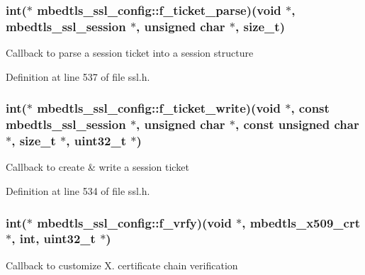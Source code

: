\hypertarget{structmbedtls__ssl__config_a8524cfef06d1e707603437926a487089}{
\subsubsection[{f\-\_\-ticket\-\_\-parse}]{\setlength{\rightskip}{0pt plus 5cm}int($\ast$ mbedtls\-\_\-ssl\-\_\-config\-::f\-\_\-ticket\-\_\-parse)(void $\ast$, {\bf mbedtls\-\_\-ssl\-\_\-session} $\ast$, unsigned char $\ast$, size\-\_\-t)}}\label{structmbedtls__ssl__config_a8524cfef06d1e707603437926a487089}
Callback to parse a session ticket into a session structure 

Definition at line 537 of file ssl.\-h.

\hypertarget{structmbedtls__ssl__config_aea65bf00504dd75984afa3b91e90b8f0}{
\subsubsection[{f\-\_\-ticket\-\_\-write}]{\setlength{\rightskip}{0pt plus 5cm}int($\ast$ mbedtls\-\_\-ssl\-\_\-config\-::f\-\_\-ticket\-\_\-write)(void $\ast$, const {\bf mbedtls\-\_\-ssl\-\_\-session} $\ast$, unsigned char $\ast$, const unsigned char $\ast$, size\-\_\-t $\ast$, uint32\-\_\-t $\ast$)}}\label{structmbedtls__ssl__config_aea65bf00504dd75984afa3b91e90b8f0}
Callback to create \& write a session ticket 

Definition at line 534 of file ssl.\-h.

\hypertarget{structmbedtls__ssl__config_adbb2dc3740e0f1d726f8e9ff026b6d11}{
\subsubsection[{f\-\_\-vrfy}]{\setlength{\rightskip}{0pt plus 5cm}int($\ast$ mbedtls\-\_\-ssl\-\_\-config\-::f\-\_\-vrfy)(void $\ast$, {\bf mbedtls\-\_\-x509\-\_\-crt} $\ast$, int, uint32\-\_\-t $\ast$)}}\label{structmbedtls__ssl__config_adbb2dc3740e0f1d726f8e9ff026b6d11}
Callback to customize X. certificate chain verification 

